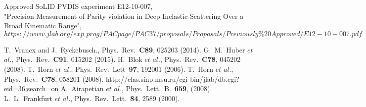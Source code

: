 \begin{thebibliography}{}
  Approved SoLID PVDIS experiment E12-10-007,\\
  "Precision Measurement of Parity-violation in Deep Inelastic Scattering Over a Broad Kinematic Range",\\
  $https://www.jlab.org/exp\_prog/PACpage/PAC37/proposals/Proposals/Previously\%20Approved/E12-10-007.pdf$


	        T.~Vrancx and J.~Ryckebusch., Phys.~Rev.~\textbf{C89}, 025203 (2014).
	G.~M.~Huber $\textit{et}$ $\textit{al}$., Phys.~Rev.~\textbf{C91}, 015202 (2015).
	H.~Blok $\textit{et}$ $\textit{al}$., Phys.~Rev.~\textbf{C78}, 045202 (2008).
	T.~Horn $\textit{et}$ $\textit{al}$., Phys.~Rev.~Lett~\textbf{97}, 192001 (2006).
	T.~Horn $\textit{et}$ $\textit{al}$., Phys.~Rev.~\textbf{C78}, 058201 (2008).
	        http://clas.sinp.msu.ru/cgi-bin/jlab/db.cgi?eid=36;search=on
	A.~Airapetian $\textit{et}$ $\textit{al}$., Phys.~Lett.~B.~\textbf{659}, (2008).
	L.~L.~Frankfurt $\textit{et}$ $\textit{al}$., Phys.~Rev.~Lett.~\textbf{84}, 2589 (2000).

\end{thebibliography}
